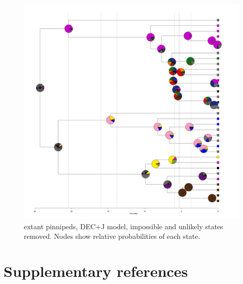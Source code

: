\documentclass[a4paper, 12pt]{article}
\begin{document}
\begin{figure}[H]
 \centering
  \includegraphics[width = \linewidth]{figures/extant-pinnipeds-DECj-unlikely-pies.png}
 \caption{extant pinnipeds, DEC+J model, impossible and unlikely states removed. Nodes show relative probabilities of each state.}
  \label{fig-extant-decj-pie-unlikely}
\end{figure} 

\newpage
\section{Supplementary references}
 


\end{document}
